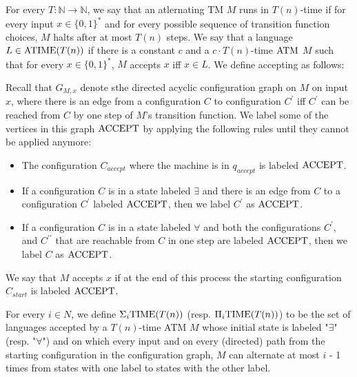 \begin{note}
For every $T : \mathbb{N} \to \mathbb{N}$, we say that an atlernating
TM $M$ runs in $T(n)$-time if for every input $x \in \{0, 1\}^\ast$ and
for every possible sequence of transition function choices, $M$ halts after
at most $T(n)$ steps.
We say that a language $L \in \mathrm{ATIME}(T(n))$ if there is a constant $c$ and
a $c\cdot T(n)$-time $\mathrm{ATM}$ $M$ such that for every $x \in \{0, 1\}^\ast$,
$M$ accepts $x$ iff $x \in L$.
We define accepting as follows:

Recall that $G_{M, x}$ denote sthe directed acyclic configuration graph on
$M$ on input $x$, where there is an edge from a configuration $C$ to
configuration $C^\prime$ iff $C^\prime$ can be reached from $C$ by one
step of $M$'s transition function.
We label some of the vertices in this graph $\mathrm{ACCEPT}$ by applying
the following rules until they cannot be applied anymore:
\begin{itemize}
  \item
    The configuration $C_{accept}$ where the machine is in $q_{accept}$ is
    labeled $\mathrm{ACCEPT}$.

  \item
    If a configuration $C$ is in a state labeled $\exists$ and there is an
    edge from $C$ to a configuration $C^\prime$ labeled $\mathrm{ACCEPT}$, then we
    label $C^\prime$ as $\mathrm{ACCEPT}$.

  \item
    If a configuration $C$ is in a state labeled $\forall$ and both the
    configurations $C^\prime$, and $C^{\prime \prime}$ that are reachable
    from $C$ in one step are labeled $\mathrm{ACCEPT}$, then we label $C$ as $\mathrm{ACCEPT}$.
\end{itemize}

We say that $M$ accepts $x$ if at the end of this process the starting
configuration $C_{start}$ is labeled $\mathrm{ACCEPT}$.
\end{note}

\begin{note}
For every $i \in N$, we define $\Sigma_{i} \mathrm{TIME}(T(n))$
(resp. $\Pi_{i}\mathrm{TIME}(T(n))$) to be the set of languages accepted by
a $T(n)$-time ATM $M$ whose initial state is labeled "$\exists$"
(resp. "$\forall$") and on which every input and on every (directed) path
from the starting configuration in the configuration graph, $M$ can alternate
at most $i$ - 1 times from states with one label to states with the
other label.
\end{note}

